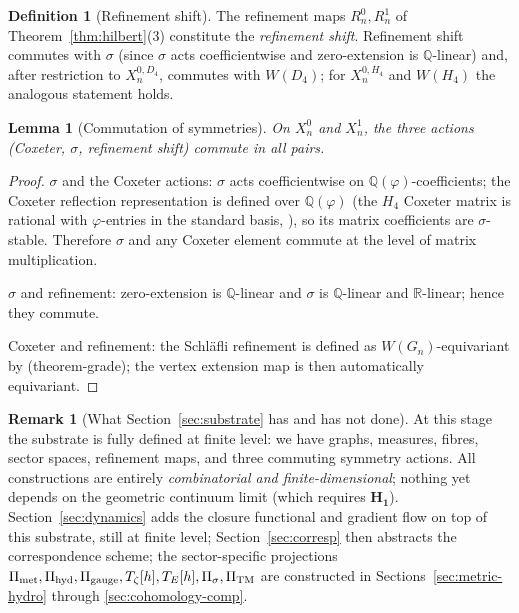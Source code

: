 \documentclass[11pt, a4paper]{amsart}
\newtheorem{lemma}[theorem]{Lemma}
\theoremstyle{definition}
\newtheorem{definition}[theorem]{Definition}
\newtheorem{remark}[theorem]{Remark}
\newcommand{\R}{\mathbb{R}}
\newcommand{\Q}{\mathbb{Q}}
\newcommand{\pphi}{\varphi}
\newcommand{\met}{{\rm met}}
\newcommand{\hyd}{{\rm hyd}}
\newcommand{\gge}{{\rm gauge}}
\newcommand{\TM}{{\rm TM}}
\begin{document}
\begin{definition}[Refinement shift]
\label{def:refine-shift}
The refinement maps $R_n^0, R_n^1$ of
Theorem~\ref{thm:hilbert}(3) constitute the \emph{refinement shift}.
Refinement shift commutes with $\sigma$ (since $\sigma$ acts
coefficientwise and zero-extension is $\Q$-linear) and, after
restriction to $X_n^{0,D_4}$, commutes with $W(D_4)$; for
$X_n^{0,H_4}$ and $W(H_4)$ the analogous statement holds.
\end{definition}

\begin{lemma}[Commutation of symmetries]
\label{lem:commute-subst}
On $X_n^0$ and $X_n^1$, the three actions (Coxeter, $\sigma$,
refinement shift) commute in all pairs.
\end{lemma}

\begin{proof}
$\sigma$ and the Coxeter actions: $\sigma$ acts coefficientwise on
$\Q(\pphi)$-coefficients; the Coxeter reflection representation is
defined over $\Q(\pphi)$ (the $H_4$ Coxeter matrix is rational with
$\pphi$-entries in the standard basis,
\cite[\S 3]{CascadeEmbeddings}), so its matrix coefficients are
$\sigma$-stable. Therefore $\sigma$ and any Coxeter element commute
at the level of matrix multiplication.

$\sigma$ and refinement: zero-extension is $\Q$-linear and
$\sigma$ is $\Q$-linear and $\R$-linear; hence they commute.

Coxeter and refinement: the Schl\"afli refinement is defined as
$W(G_n)$-equivariant by \cite[\S 12.2]{CascadeEmbeddings}
(theorem-grade); the vertex extension map is then automatically
equivariant.
\end{proof}

\begin{remark}[What Section~\ref{sec:substrate} has and has not done]
At this stage the substrate is fully defined at finite level: we
have graphs, measures, fibres, sector spaces, refinement maps,
and three commuting symmetry actions. All constructions are
entirely \emph{combinatorial and finite-dimensional}; nothing yet
depends on the geometric continuum limit (which requires
$\mathbf{H_1}$). Section~\ref{sec:dynamics} adds the closure
functional and gradient flow on top of this substrate, still at
finite level; Section~\ref{sec:corresp} then abstracts the
correspondence scheme; the sector-specific projections
$\Pi_{\met}, \Pi_{\hyd}, \Pi_{\gge}, T_\zeta[h], T_E[h], \Pi_\sigma,
\Pi_\TM$ are constructed in Sections~\ref{sec:metric-hydro} through
\ref{sec:cohomology-comp}.
\end{remark}
\end{document}
